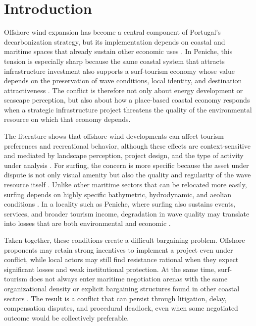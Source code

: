 \documentclass[final,times,authoryear]{elsarticle}
\begin{document}
\section{Introduction}
\label{sec_introduction}

Offshore wind expansion has become a central component of Portugal's decarbonization strategy, but its implementation depends on coastal and maritime spaces that already sustain other economic uses \citep{portugal_draft_necp_2023,iea_wind_portugal_2024}. In Peniche, this tension is especially sharp because the same coastal system that attracts infrastructure investment also supports a surf-tourism economy whose value depends on the preservation of wave conditions, local identity, and destination attractiveness \citep{visit_portugal_peniche,cm_peniche_benchmark_2017,gonzalez_peniche_2025}. The conflict is therefore not only about energy development or seascape perception, but also about how a place-based coastal economy responds when a strategic infrastructure project threatens the quality of the environmental resource on which that economy depends.

The literature shows that offshore wind developments can affect tourism preferences and recreational behavior, although these effects are context-sensitive and mediated by landscape perception, project design, and the type of activity under analysis \citep{machado_implications_2023,oh_impacts_2023,trandafir_how_2020,voltaire_public_2020,smythe_beyond_2020}. For surfing, the concern is more specific because the asset under dispute is not only visual amenity but also the quality and regularity of the wave resource itself \citep{scarfe_surfing_review_2009,corne_surfing_development_2009,sewage_guidance_2009}. Unlike other maritime sectors that can be relocated more easily, surfing depends on highly specific bathymetric, hydrodynamic, and aeolian conditions \citep{scarfe_surfing_review_2009,corne_surfing_development_2009}. In a locality such as Peniche, where surfing also sustains events, services, and broader tourism income, degradation in wave quality may translate into losses that are both environmental and economic \citep{gonzalez_peniche_2025,cm_peniche_surf_sustainability_2017}.

Taken together, these conditions create a difficult bargaining problem. Offshore proponents may retain strong incentives to implement a project even under conflict, while local actors may still find resistance rational when they expect significant losses and weak institutional protection. At the same time, surf-tourism does not always enter maritime negotiation arenas with the same organizational density or explicit bargaining structures found in other coastal sectors \citep{cm_peniche_surf_sustainability_2017,gonzalez_peniche_2025}. The result is a conflict that can persist through litigation, delay, compensation disputes, and procedural deadlock, even when some negotiated outcome would be collectively preferable.
\end{document}
